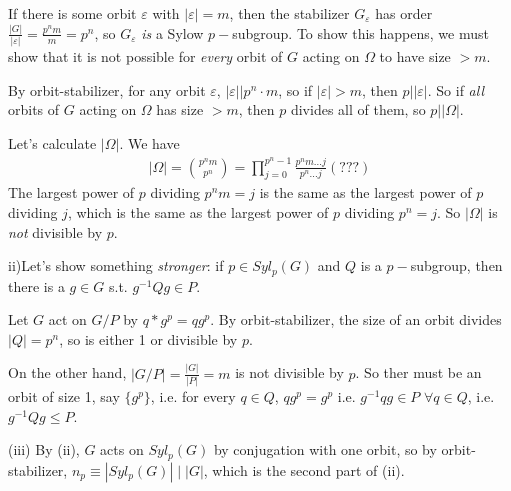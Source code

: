 \documentclass[a4paper]{article}
\begin{document}
If there is some orbit $\varepsilon$ with $|\varepsilon|=m$, then the stabilizer $G_\varepsilon$ has order $\frac{|G|}{|\varepsilon|} = \frac{p^n m}{m} = p^n$, so $G_\varepsilon$ \emph{is} a Sylow $p-$subgroup. To show this happens, we must show that it is not possible for \emph{every} orbit of $G$ acting on $\Omega$ to have size $>m$.

By orbit-stabilizer, for any orbit $\varepsilon$, $|\varepsilon| |p^n \cdot m$, so if $|\varepsilon|>m$, then $p | |\varepsilon|$. So if \emph{all} orbits of $G$ acting on $\Omega$ has size $>m$, then $p$ divides all of them, so $p | |\Omega|$. 

Let's calculate $|\Omega|$. We have
\begin{equation*}
\begin{aligned}
|\Omega| = {p^n m \choose p^n} = \prod_{j=0}^{p^n-1} \frac{p^nm ... j}{p^n ... j} (???)
\end{aligned}
\end{equation*}
The largest power of $p$ dividing $p^n m=j$ is the same as the largest power of $p$ dividing $j$, which is the same as the largest power of $p$ dividing $p^n = j$. So $|\Omega|$ is \emph{not} divisible by $p$.

ii)Let's show something \emph{stronger}: if $p \in Syl_p(G)$ and $Q$ is a $p-$subgroup, then there is a $g \in G$ s.t. $g^{-1}Qg \in P$.

Let $G$ act on $G/P$ by $q*g^p = qg^p$.  By orbit-stabilizer, the size of an orbit divides $|Q| = p^n$, so is either 1 or divisible by $p$.

On the other hand, $|G/P| = \frac{|G|}{|P|} = m$ is not divisible by $p$. So ther must be an orbit of size 1, say $\{g^p\}$, i.e. for every $q \in Q$, $qg^p = g^p$ i.e. $g^{-1}qg \in P$ $\forall q \in Q$, i.e. $g^{-1} Qg \leq P$.

(iii) By (ii), $G$ acts on $Syl_p(G)$ by conjugation with one orbit, so by orbit-stabilizer, $n_p \equiv |Syl_p(G)| \mid |G|$, which is the second part of (ii).
\end{document}
